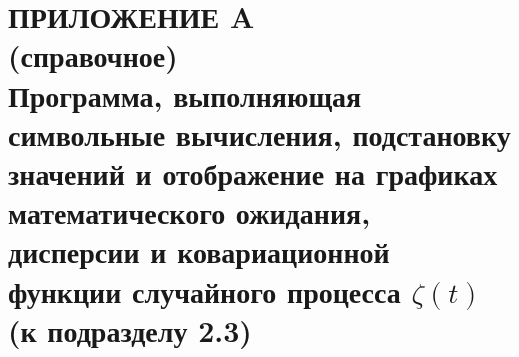 \renewcommand{\thefigure}{\Asbuk{section}.\arabic{figure}}
\renewcommand{\thetable}{\Asbuk{section}.\arabic{table}}
\renewcommand{\thelstlisting}{\Asbuk{section}.\arabic{lstlisting}}

\pagestyle{fancy}
\fancyhf{} %
\fancyfoot[R]{\thepage} 
\renewcommand{\headrulewidth}{0pt}
\renewcommand{\footrulewidth}{0pt}

\setlength{\headheight}{10mm}
\setlength{\headsep}{\baselineskip}

\section*{ПРИЛОЖЕНИЕ A \\ (справочное) \\ Программа, выполняющая символьные вычисления,
	подстановку значений и отображение на графиках
	математического ожидания, дисперсии и ковариационной функции
	случайного процесса $ \zeta(t) $ (к подразделу 2.3)}
\thispagestyle{plain} 
\setcounter{section}{1}
\setcounter{figure}{0}
\setcounter{table}{0}
\setcounter{lstlisting}{0}

